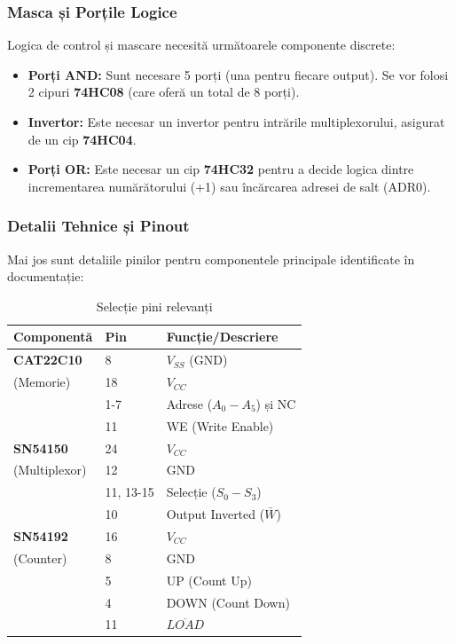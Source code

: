 \subsubsection{Masca și Porțile Logice}
Logica de control și mascare necesită următoarele componente discrete:
\begin{itemize}
    \item \textbf{Porți AND:} Sunt necesare 5 porți (una pentru fiecare output). Se vor folosi 2 cipuri \textbf{74HC08} (care oferă un total de 8 porți).
    \item \textbf{Invertor:} Este necesar un invertor pentru intrările multiplexorului, asigurat de un cip \textbf{74HC04}.
    \item \textbf{Porți OR:} Este necesar un cip \textbf{74HC32} pentru a decide logica dintre incrementarea numărătorului (+1) sau încărcarea adresei de salt (ADR0).
\end{itemize}

\subsubsection{Detalii Tehnice și Pinout}

Mai jos sunt detaliile pinilor pentru componentele principale identificate în documentație:

\begin{table}[h]
\centering
\begin{tabular}{|l|l|l|}
\hline
\textbf{Componentă} & \textbf{Pin} & \textbf{Funcție/Descriere} \\ \hline
\textbf{CAT22C10} & 8 & $V_{SS}$ (GND) \\
(Memorie) & 18 & $V_{CC}$ \\
 & 1-7 & Adrese ($A_0 - A_5$) și NC \\
 & 11 & WE (Write Enable) \\ \hline
\textbf{SN54150} & 24 & $V_{CC}$ \\
(Multiplexor) & 12 & GND \\
 & 11, 13-15 & Selecție ($S_0 - S_3$) \\
 & 10 & Output Inverted ($\bar{W}$) \\ \hline
\textbf{SN54192} & 16 & $V_{CC}$ \\
(Counter) & 8 & GND \\
 & 5 & UP (Count Up) \\
 & 4 & DOWN (Count Down) \\
 & 11 & $\overline{LOAD}$ \\ \hline
\end{tabular}
\caption{Selecție pini relevanți}
\end{table}
